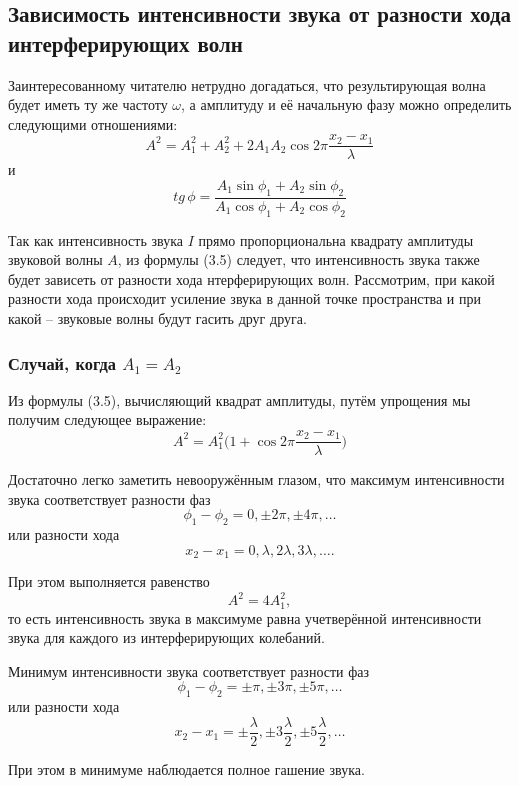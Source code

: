 \documentclass[referat,times]{SCWorks}
\begin{document}
\subsection{Зависимость интенсивности звука от разности хода интерферирующих волн}
\par Заинтересованному читателю нетрудно догадаться, что результирующая волна будет иметь ту же частоту $\omega$, а амплитуду и её начальную фазу можно определить следующими отношениями:
\begin{equation}
    A^2 = A_1^2 + A_2^2 + 2 A_1 A_2 \cos{2\pi \frac{x_2 - x_1}{\lambda}}
\end{equation}
и
\begin{equation}
    tg \, \phi = \frac{A_1 \sin{\phi_1} + A_2 \sin{\phi_2}}{A_1 \cos{\phi_1} + A_2 \cos{\phi_2}}
\end{equation}
\par Так как интенсивность звука $I$ прямо пропорциональна квадрату амплитуды звуковой волны $A$, из формулы (3.5) следует, что интенсивность звука также будет зависеть от разности хода нтерферирующих волн. Рассмотрим, при какой разности хода происходит усиление звука в данной точке пространства и при какой -- звуковые волны будут гасить друг друга.
\subsubsection{Случай, когда $A_1 = A_2$}
\par Из формулы (3.5), вычисляющий квадрат амплитуды, путём упрощения мы получим следующее выражение:
\begin{equation}
    A^2 = A^2_1\bigg(1 + \cos{2\pi\frac{x_2 - x_1}{\lambda}}\bigg)
\end{equation}
\par Достаточно легко заметить невооружённым глазом, что максимум интенсивности звука соответствует разности фаз
\begin{equation*}
    \phi_1 - \phi_2 = 0, \pm 2\pi, \pm 4 \pi, \dots
\end{equation*}
или разности хода
\begin{equation*}
    x_2 - x_1 = 0, \lambda, 2\lambda, 3\lambda, \dots .
\end{equation*}
\par При этом выполняется равенство
\begin{equation*}
    A^2 = 4 A_1^2,
\end{equation*}
то есть интенсивность звука в максимуме равна учетверённой интенсивности звука для каждого из интерферирующих колебаний.
\par Минимум интенсивности звука соответствует разности фаз
\begin{equation*}
    \phi_1 - \phi_2 = \pm \pi, \pm 3 \pi, \pm 5 \pi, \dots
\end{equation*}
или разности хода
\begin{equation*}
    x_2 - x_1 = \pm \frac \lambda 2, \pm 3 \frac \lambda 2, \pm 5 \frac \lambda 2 , \dots
\end{equation*}
\par При этом в минимуме наблюдается полное гашение звука.
\end{document}
